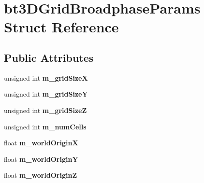 \hypertarget{structbt3_d_grid_broadphase_params}{\section{bt3\+D\+Grid\+Broadphase\+Params Struct Reference}
\label{structbt3_d_grid_broadphase_params}
}
\subsection*{Public Attributes}
\begin{DoxyCompactItemize}
\item 
\hypertarget{structbt3_d_grid_broadphase_params_adc70856967bc62230361ec28180f5345}{unsigned int {\bfseries m\+\_\+grid\+Size\+X}}\label{structbt3_d_grid_broadphase_params_adc70856967bc62230361ec28180f5345}

\item 
\hypertarget{structbt3_d_grid_broadphase_params_a3619326f3b95566d301011f675434420}{unsigned int {\bfseries m\+\_\+grid\+Size\+Y}}\label{structbt3_d_grid_broadphase_params_a3619326f3b95566d301011f675434420}

\item 
\hypertarget{structbt3_d_grid_broadphase_params_a13cdda55d295d2f5b7eb5c74660dde14}{unsigned int {\bfseries m\+\_\+grid\+Size\+Z}}\label{structbt3_d_grid_broadphase_params_a13cdda55d295d2f5b7eb5c74660dde14}

\item 
\hypertarget{structbt3_d_grid_broadphase_params_a270650daad5611c2c189b0b68d5fb292}{unsigned int {\bfseries m\+\_\+num\+Cells}}\label{structbt3_d_grid_broadphase_params_a270650daad5611c2c189b0b68d5fb292}

\item 
\hypertarget{structbt3_d_grid_broadphase_params_a2048508f20202b758c627807dfc9434d}{float {\bfseries m\+\_\+world\+Origin\+X}}\label{structbt3_d_grid_broadphase_params_a2048508f20202b758c627807dfc9434d}

\item 
\hypertarget{structbt3_d_grid_broadphase_params_a7d58885fa7a4991ed1263f81e855aecd}{float {\bfseries m\+\_\+world\+Origin\+Y}}\label{structbt3_d_grid_broadphase_params_a7d58885fa7a4991ed1263f81e855aecd}

\item 
\hypertarget{structbt3_d_grid_broadphase_params_a0491c5a9c15cfa8a80bf92c353fa718c}{float {\bfseries m\+\_\+world\+Origin\+Z}}\label{structbt3_d_grid_broadphase_params_a0491c5a9c15cfa8a80bf92c353fa718c}


\end{DoxyCompactItemize}
